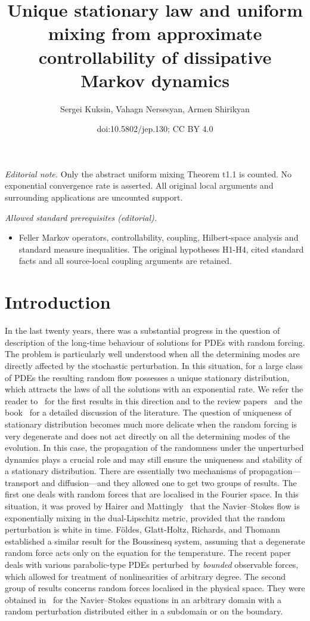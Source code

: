 \documentclass[11pt]{article}
\title{Unique stationary law and uniform mixing from approximate controllability of dissipative Markov dynamics}
\author{Sergei Kuksin, Vahagn Nersesyan, Armen Shirikyan}
\date{doi:10.5802/jep.130; CC BY 4.0}
\theoremstyle{plain}
\theoremstyle{definition}
\theoremstyle{plain}
\numberwithin{equation}{section}
\begin{document}
\maketitle
\noindent\textit{Editorial note.} Only the abstract uniform mixing Theorem t1.1 is counted. No exponential convergence rate is asserted. All original local arguments and surrounding applications are uncounted support.\par\medskip
\noindent\textit{Allowed standard prerequisites (editorial).}\begin{itemize}
\item Feller Markov operators, controllability, coupling, Hilbert-space analysis and standard measure inequalities. The original hypotheses H1-H4, cited standard facts and all source-local coupling arguments are retained.
\end{itemize}\medskip
\setcounter{section}{-1}

\section{Introduction}
\label{s0}
In the last twenty years, there was a substantial progress in the question of description of the long-time behaviour of solutions for PDEs with random forcing. The problem is particularly well understood when all the determining modes are directly affected by the stochastic perturbation. In this situation, for a large class of PDEs the resulting random flow possesses a unique stationary distribution, which attracts the laws of all the solutions with an exponential rate. We refer the reader to~\cite{FM-1995,KS-cmp2000,EMS-2001,BKL-2002} for the first results in this direction and to the review papers~\cite{ES-2000,bricmont-2002,debussche-2013} and the book~\cite{KS-book} for a detailed discussion of the literature. The question of uniqueness of stationary distribution becomes much more delicate when the random forcing is very degenerate and does not act directly on all the determining modes of the evolution. In this case, the propagation of the randomness under the unperturbed dynamics plays a crucial role and may still ensure the uniqueness and stability of a stationary distribution. There are essentially two mechanisms of propagation---transport and diffusion---and they allowed one to get two groups of results. The first one deals with random forces that are localised in the Fourier space. In this situation, it was proved by Hairer and Mattingly~\cite{HM-2006,HM-2011} that the Navier--Stokes flow is exponentially mixing in the dual-Lipschitz metric, provided that the random perturbation is white in time. Földes, Glatt-Holtz, Richards, and Thomann~\cite{FGRT-2015} established a similar result for the Boussinesq system, assuming that a degenerate random force acts only on the equation for the temperature. The recent paper~\cite{KNS-2020} deals with various parabolic-type PDEs perturbed by \emph{bounded} observable forces, which allowed for treatment of nonlinearities of arbitrary degree. The second group of results concerns random forces localised in the physical space. They were obtained in~\cite{shirikyan-asens2015,shirikyan-2020} for the Navier--Stokes equations in an arbitrary domain with a random perturbation distributed either in a subdomain or on the boundary.
\end{document}
